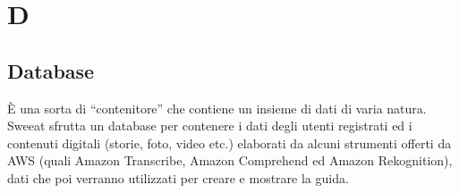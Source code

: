 \section{D}

\subsection{Database} È una sorta di “contenitore” che contiene un insieme di dati di varia natura. Sweeat sfrutta un database per contenere i dati degli utenti registrati ed i contenuti digitali (storie, foto, video etc.) elaborati da alcuni strumenti offerti da AWS (quali Amazon Transcribe, Amazon Comprehend ed Amazon Rekognition), dati che poi verranno utilizzati per creare e mostrare la guida.

\clearpage